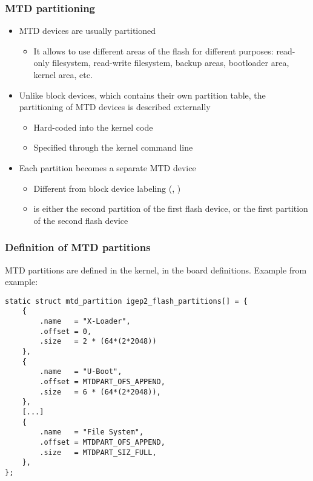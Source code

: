 \begin{frame}
  \frametitle{MTD partitioning}
  \begin{itemize}
  \item MTD devices are usually partitioned
    \begin{itemize}
    \item It allows to use different areas of the flash for different
      purposes: read-only filesystem, read-write filesystem, backup
      areas, bootloader area, kernel area, etc.
    \end{itemize}
  \item Unlike block devices, which contains their own partition
    table, the partitioning of MTD devices is described externally
    \begin{itemize}
    \item Hard-coded into the kernel code
    \item Specified through the kernel command line
    \end{itemize}
  \item Each partition becomes a separate MTD device
    \begin{itemize}
    \item Different from block device labeling (,
      )
    \item {} is either the second partition of the first
      flash device, or the first partition of the second flash device
\end{itemize}
\end{itemize}
\end{frame}

\begin{frame}[fragile]
  \frametitle{Definition of MTD partitions}

  MTD partitions are defined in the kernel, in the board
  definitions. Example from
   example:
\scriptsize
\begin{verbatim}
static struct mtd_partition igep2_flash_partitions[] = {
    {
        .name   = "X-Loader",
        .offset = 0,
        .size   = 2 * (64*(2*2048))
    },
    {
        .name   = "U-Boot",
        .offset = MTDPART_OFS_APPEND,
        .size   = 6 * (64*(2*2048)),
    },
    [...]
    {
        .name   = "File System",
        .offset = MTDPART_OFS_APPEND,
        .size   = MTDPART_SIZ_FULL,
    },
};
\end{verbatim}
\end{frame}

